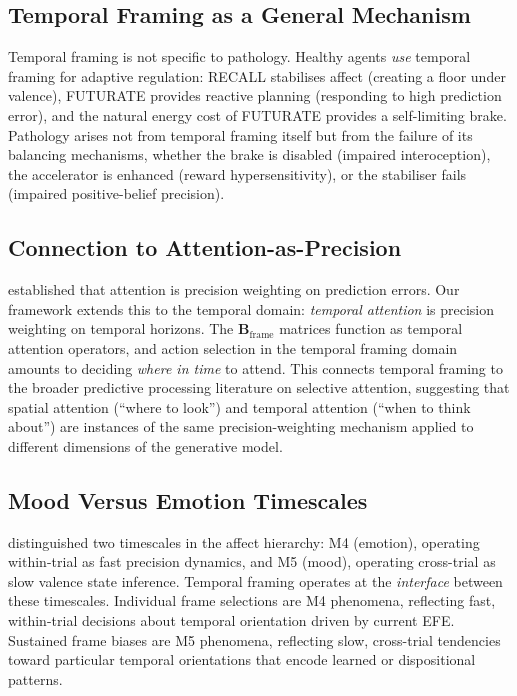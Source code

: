 \documentclass[11pt,a4paper]{article}
\begin{document}
\subsection{Temporal Framing as a General Mechanism}\label{sec:general_mechanism}

Temporal framing is not specific to pathology. Healthy agents \emph{use} temporal framing for adaptive regulation: RECALL stabilises affect (creating a floor under valence), FUTURATE provides reactive planning (responding to high prediction error), and the natural energy cost of FUTURATE provides a self-limiting brake. Pathology arises not from temporal framing itself but from the failure of its balancing mechanisms, whether the brake is disabled (impaired interoception), the accelerator is enhanced (reward hypersensitivity), or the stabiliser fails (impaired positive-belief precision).

\subsection{Connection to Attention-as-Precision}\label{sec:attention_connection}

\citet{feldman2010attention} established that attention is precision weighting on prediction errors. Our framework extends this to the temporal domain: \emph{temporal attention} is precision weighting on temporal horizons. The $\mathbf{B}_{\text{frame}}$ matrices function as temporal attention operators, and action selection in the temporal framing domain amounts to deciding \emph{where in time} to attend. This connects temporal framing to the broader predictive processing literature on selective attention, suggesting that spatial attention (``where to look'') and temporal attention (``when to think about'') are instances of the same precision-weighting mechanism applied to different dimensions of the generative model.

\subsection{Mood Versus Emotion Timescales}\label{sec:mood_emotion}

\citet{hesp2021deeply} distinguished two timescales in the affect hierarchy: M4 (emotion), operating within-trial as fast precision dynamics, and M5 (mood), operating cross-trial as slow valence state inference. Temporal framing operates at the \emph{interface} between these timescales. Individual frame selections are M4 phenomena, reflecting fast, within-trial decisions about temporal orientation driven by current EFE. Sustained frame biases are M5 phenomena, reflecting slow, cross-trial tendencies toward particular temporal orientations that encode learned or dispositional patterns.
\end{document}
